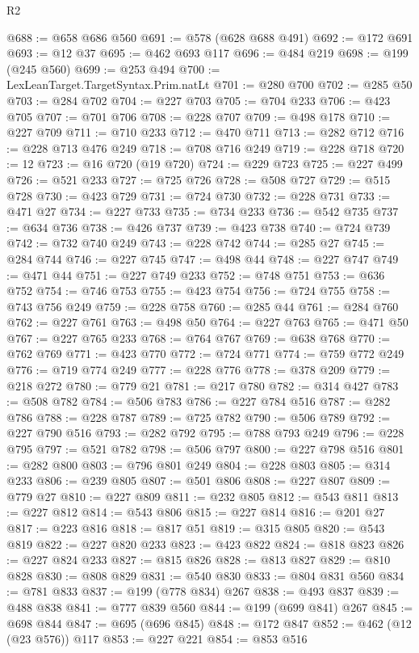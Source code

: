 \begin{lexlean}{R2}
\begin{coremodule}
@688 := @658 @686 @560
@691 := @578 (@628 @688 @491)
@692 := @172 @691
@693 := @12 @37
@695 := @462 @693 @117
@696 := @484 @219
@698 := @199 (@245 @560)
@699 := @253 @494
@700 := LexLeanTarget.TargetSyntax.Prim.natLt
@701 := @280 @700
@702 := @285 @50
@703 := @284 @702
@704 := @227 @703
@705 := @704 @233
@706 := @423 @705
@707 := @701 @706
@708 := @228 @707
@709 := @498 @178
@710 := @227 @709
@711 := @710 @233
@712 := @470 @711
@713 := @282 @712
@716 := @228 @713 @476 @249
@718 := @708 @716 @249
@719 := @228 @718
@720 := 12
@723 := @16 @720 (@19 @720)
@724 := @229 @723
@725 := @227 @499
@726 := @521 @233
@727 := @725 @726
@728 := @508 @727
@729 := @515 @728
@730 := @423 @729
@731 := @724 @730
@732 := @228 @731
@733 := @471 @27
@734 := @227 @733
@735 := @734 @233
@736 := @542 @735
@737 := @634 @736
@738 := @426 @737
@739 := @423 @738
@740 := @724 @739
@742 := @732 @740 @249
@743 := @228 @742
@744 := @285 @27
@745 := @284 @744
@746 := @227 @745
@747 := @498 @44
@748 := @227 @747
@749 := @471 @44
@751 := @227 @749 @233
@752 := @748 @751
@753 := @636 @752
@754 := @746 @753
@755 := @423 @754
@756 := @724 @755
@758 := @743 @756 @249
@759 := @228 @758
@760 := @285 @44
@761 := @284 @760
@762 := @227 @761
@763 := @498 @50
@764 := @227 @763
@765 := @471 @50
@767 := @227 @765 @233
@768 := @764 @767
@769 := @638 @768
@770 := @762 @769
@771 := @423 @770
@772 := @724 @771
@774 := @759 @772 @249
@776 := @719 @774 @249
@777 := @228 @776
@778 := @378 @209
@779 := @218 @272
@780 := @779 @21
@781 := @217 @780
@782 := @314 @427
@783 := @508 @782
@784 := @506 @783
@786 := @227 @784 @516
@787 := @282 @786
@788 := @228 @787
@789 := @725 @782
@790 := @506 @789
@792 := @227 @790 @516
@793 := @282 @792
@795 := @788 @793 @249
@796 := @228 @795
@797 := @521 @782
@798 := @506 @797
@800 := @227 @798 @516
@801 := @282 @800
@803 := @796 @801 @249
@804 := @228 @803
@805 := @314 @233
@806 := @239 @805
@807 := @501 @806
@808 := @227 @807
@809 := @779 @27
@810 := @227 @809
@811 := @232 @805
@812 := @543 @811
@813 := @227 @812
@814 := @543 @806
@815 := @227 @814
@816 := @201 @27
@817 := @223 @816
@818 := @817 @51
@819 := @315 @805
@820 := @543 @819
@822 := @227 @820 @233
@823 := @423 @822
@824 := @818 @823
@826 := @227 @824 @233
@827 := @815 @826
@828 := @813 @827
@829 := @810 @828
@830 := @808 @829
@831 := @540 @830
@833 := @804 @831 @560
@834 := @781 @833
@837 := @199 (@778 @834) @267
@838 := @493 @837
@839 := @488 @838
@841 := @777 @839 @560
@844 := @199 (@699 @841) @267
@845 := @698 @844
@847 := @695 (@696 @845)
@848 := @172 @847
@852 := @462 (@12 (@23 @576)) @117
@853 := @227 @221
@854 := @853 @516

\end{coremodule}
\end{lexlean}
